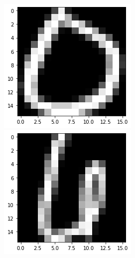 \documentclass[a4paper,10pt]{report}
\begin{document}
\begin{figure}[!htb]
    \includegraphics[width=\linewidth]{0.png}
  \endminipage\hfill
  \includegraphics[width=\linewidth]{6.png}
  \endminipage\hfill

\end{figure}
\end{document}
